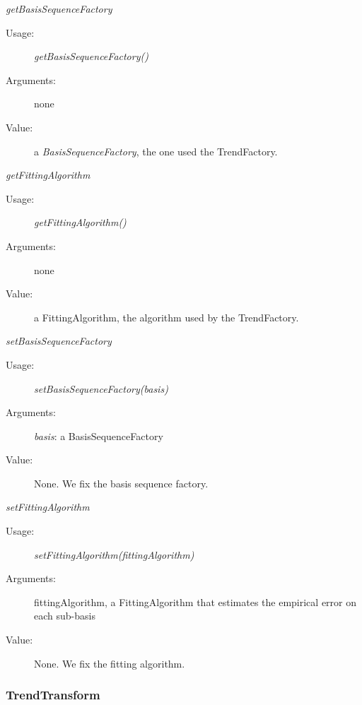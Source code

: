 \begin{description}
\begin{description}
\item \textit{getBasisSequenceFactory}
\begin{description}
\item[Usage:] \textit{getBasisSequenceFactory()}
\item[Arguments:] none
\item[Value:] a \textit{BasisSequenceFactory}, the one used the TrendFactory.
\end{description}
\bigskip

\item \textit{getFittingAlgorithm}
\begin{description}
\item[Usage:] \textit{getFittingAlgorithm()}
\item[Arguments:] none
\item[Value:] a FittingAlgorithm, the algorithm used by the TrendFactory.
\end{description}
\bigskip

\item \textit{setBasisSequenceFactory}
\begin{description}
\item[Usage:] \textit{setBasisSequenceFactory(basis)}
\item[Arguments:]  \textit{basis}: a BasisSequenceFactory
\item[Value:] None. We fix the basis sequence factory.
\end{description}
\bigskip

\item \textit{setFittingAlgorithm}
\begin{description}
\item[Usage:] \textit{setFittingAlgorithm(fittingAlgorithm)}
\item[Arguments:] fittingAlgorithm, a FittingAlgorithm that estimates the empirical error on each sub-basis
\item[Value:] None. We fix the fitting algorithm.
\end{description}
\bigskip


\end{description}

\end{description}


\newpage
\subsubsection{TrendTransform}

